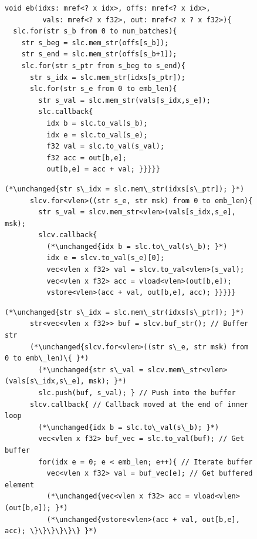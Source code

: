 \begin{figure}
    \centering
    \begin{minipage}{\columnwidth}
    \begin{lstlisting}[basicstyle=\ttfamily\footnotesize]
void eb(idxs: mref<? x idx>, offs: mref<? x idx>,
         vals: mref<? x f32>, out: mref<? x ? x f32>){
  slc.for(str s_b from 0 to num_batches){
    str s_beg = slc.mem_str(offs[s_b]);
    str s_end = slc.mem_str(offs[s_b+1]);
    slc.for(str s_ptr from s_beg to s_end){
      str s_idx = slc.mem_str(idxs[s_ptr]);
      slc.for(str s_e from 0 to emb_len){
        str s_val = slc.mem_str(vals[s_idx,s_e]);
        slc.callback{
          idx b = slc.to_val(s_b);
          idx e = slc.to_val(s_e);
          f32 val = slc.to_val(s_val);
          f32 acc = out[b,e];
          out[b,e] = acc + val; }}}}}
    \end{lstlisting}
    \vspace{-1em}
    \label{fig:ember-slc-unoptimized-code}
    \end{minipage}

    \begin{minipage}{\columnwidth}
    \begin{lstlisting}[basicstyle=\ttfamily\footnotesize,firstnumber=7]
      (*\unchanged{str s\_idx = slc.mem\_str(idxs[s\_ptr]); }*)
      slcv.for<vlen>((str s_e, str msk) from 0 to emb_len){
        str s_val = slcv.mem_str<vlen>(vals[s_idx,s_e], msk);
        slcv.callback{
          (*\unchanged{idx b = slc.to\_val(s\_b); }*)
          idx e = slcv.to_val(s_e)[0];
          vec<vlen x f32> val = slcv.to_val<vlen>(s_val);
          vec<vlen x f32> acc = vload<vlen>(out[b,e]);
          vstore<vlen>(acc + val, out[b,e], acc); }}}}}
    \end{lstlisting}
    \vspace{-1em}
    \label{fig:ember-slc-vectorized-code}
    \end{minipage}

    \begin{minipage}{\columnwidth}
    \begin{lstlisting}[basicstyle=\ttfamily\footnotesize,firstnumber=7]
      (*\unchanged{str s\_idx = slc.mem\_str(idxs[s\_ptr]); }*)
      str<vec<vlen x f32>> buf = slcv.buf_str(); // Buffer str
      (*\unchanged{slcv.for<vlen>((str s\_e, str msk) from 0 to emb\_len)\{ }*)
        (*\unchanged{str s\_val = slcv.mem\_str<vlen>(vals[s\_idx,s\_e], msk); }*)
        slc.push(buf, s_val); } // Push into the buffer
      slcv.callback{ // Callback moved at the end of inner loop
        (*\unchanged{idx b = slc.to\_val(s\_b); }*)
        vec<vlen x f32> buf_vec = slc.to_val(buf); // Get buffer
        for(idx e = 0; e < emb_len; e++){ // Iterate buffer
          vec<vlen x f32> val = buf_vec[e]; // Get buffered element
          (*\unchanged{vec<vlen x f32> acc = vload<vlen>(out[b,e]); }*)
          (*\unchanged{vstore<vlen>(acc + val, out[b,e], acc); \}\}\}\}\}\} }*)
    \end{lstlisting}
    \vspace{-1em}
    \label{fig:ember-slc-buffered-code}
    \end{minipage}


\end{figure}
